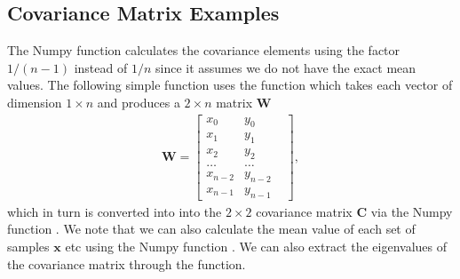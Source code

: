 \documentclass[letterpaper,10pt,english]{sphinxmanual}
\begin{document}
\subsection{Covariance Matrix Examples}
\label{\detokenize{chapter4:covariance-matrix-examples}}
The Numpy function  calculates the covariance elements using
the factor \(1/(n-1)\) instead of \(1/n\) since it assumes we do not have
the exact mean values.  The following simple function uses the
 function which takes each vector of dimension \(1\times n\)
and produces a \(2\times n\) matrix \(\boldsymbol{W}\)
\begin{equation*}
\begin{split}
\boldsymbol{W} = \begin{bmatrix} x_0 & y_0 \\
                          x_1 & y_1 \\
                          x_2 & y_2\\
                          \dots & \dots \\
                          x_{n-2} & y_{n-2}\\
                          x_{n-1} & y_{n-1} & 
             \end{bmatrix},
\end{split}
\end{equation*}
which in turn is converted into into the \(2\times 2\) covariance matrix
\(\boldsymbol{C}\) via the Numpy function . We note that we can also calculate
the mean value of each set of samples \(\boldsymbol{x}\) etc using the Numpy
function . We can also extract the eigenvalues of the
covariance matrix through the  function.

\begin{sphinxVerbatim}[commandchars=\\\{\}]
   
  
  
  
   
  
\end{sphinxVerbatim}
\end{document}
